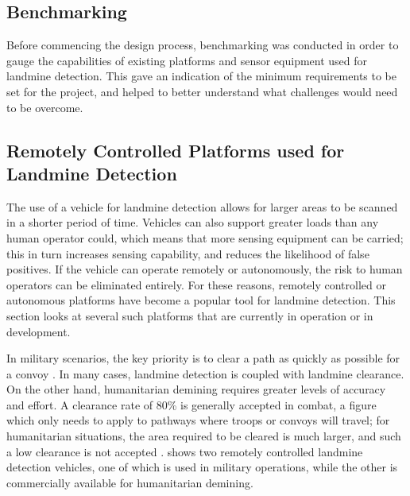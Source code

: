 \documentclass[main.tex]{subfiles}
\begin{document}
\begin{appendices}

\chapter{Benchmarking}
Before commencing the design process, benchmarking was conducted in order to gauge the capabilities of existing platforms and sensor equipment used for landmine detection. This gave an indication of the minimum requirements to be set for the project, and helped to better understand what challenges would need to be overcome.

\section{Remotely Controlled Platforms used for Landmine Detection}
The use of a vehicle for landmine detection allows for larger areas to be scanned in a shorter period of time. Vehicles can also support greater loads than any human operator could, which means that more sensing equipment can be carried; this in turn increases sensing capability, and reduces the likelihood of false positives. If the vehicle can operate remotely or autonomously, the risk to human operators can be eliminated entirely. For these reasons, remotely controlled or autonomous platforms have become a popular tool for landmine detection. This section looks at several such platforms that are currently in operation or in development. 


In military scenarios, the key priority is to clear a path as quickly as possible for a convoy \parencite{portugal2014}. In many cases, landmine detection is coupled with landmine clearance. On the other hand, humanitarian demining requires greater levels of accuracy and effort. A clearance rate of 80\% is generally accepted in combat, a figure which only needs to apply to pathways where troops or convoys will travel; for humanitarian situations, the area required to be cleared is much larger, and such a low clearance is not accepted \parencite{habib2008}.  shows two remotely controlled landmine detection vehicles, one of which is used in military operations, while the other is commercially available for humanitarian demining.   


\end{appendices}
\end{document}
